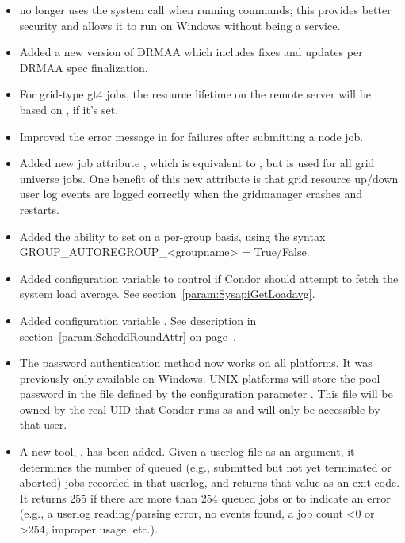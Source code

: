 \begin{itemize}
\item {} no longer uses the  system
call when running commands; this provides better security and
allows it to run on Windows without being a service.

\item Added a new version of DRMAA which includes fixes and updates per
 DRMAA spec finalization.

\item For grid-type gt4 jobs, the resource lifetime on the remote server
will be based on , if it's set.

\item Improved the error message in  for
 failures after submitting a node job.

\item Added new job attribute , which
is equivalent to , but is used for
all grid universe jobs. One benefit of this new attribute is that grid
resource up/down user log events are logged correctly when the gridmanager
crashes and restarts.

\item Added the ability to set  on a per-group
basis, using the syntax GROUP\_AUTOREGROUP\_<groupname> = True/False.

\item Added configuration variable  to control
if Condor should attempt to fetch the system load average.  
See section~\ref{param:SysapiGetLoadavg}.

\item Added configuration variable . See
description in section~\ref{param:ScheddRoundAttr} on 
page~\pageref{param:ScheddRoundAttr}.

\item The password authentication method now works on all
platforms. It was previously only available on Windows. UNIX platforms
will store the pool password in the file defined by the configuration
parameter . This file will be owned by the
real UID that Condor runs as and will only be accessible by that user.

\item A new tool, , has been added.
Given a userlog file as an argument, it determines the number of
queued (e.g., submitted but not yet terminated or aborted) jobs
recorded in that userlog, and returns that value as an exit code.  It
returns 255 if there are more than 254 queued jobs or to indicate an
error (e.g., a userlog reading/parsing error, no events found, a job
count <0 or >254, improper usage, etc.).


\end{itemize}
